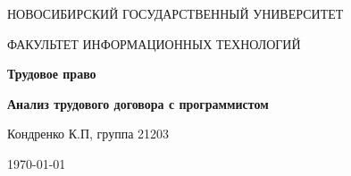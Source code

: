 \begin{center}
	{\LARGE \textsc{НОВОСИБИРСКИЙ ГОСУДАРСТВЕННЫЙ УНИВЕРСИТЕТ}\par}
	{\textsc{ФАКУЛЬТЕТ ИНФОРМАЦИОННЫХ ТЕХНОЛОГИЙ}\par}
	
	\vspace{3cm}
	
	{\huge\bfseries Трудовое право\par}
	
	\vspace{1cm}
	
	{\Large\bfseries Анализ трудового договора с программистом\par}
	
	\vspace{10cm}
	
	\begin{flushright}
		Кондренко К.П, группа 21203
	\end{flushright}
	
	\vfill
	
	{\large \today\par}
\end{center}
